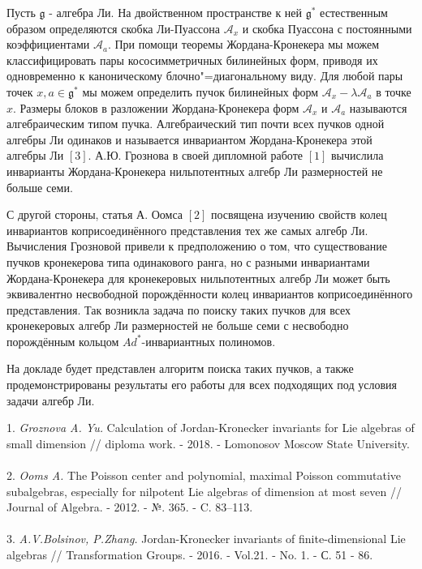 

\vzmscaption



Пусть $\mathfrak{g}$ - алгебра Ли. На двойственном пространстве к ней $\mathfrak{g}^{\ast}$ естественным образом определяются скобка Ли-Пуассона $\mathcal{A}_{x}$ и скобка Пуассона с постоянными коэффициентами $\mathcal{A}_{a}$. При помощи теоремы Жордана-Кронекера мы можем классифицировать пары кососимметричных билинейных форм, приводя их одновременно к каноническому блочно"=диагональному виду. Для любой пары точек $x,a \in\mathfrak{g}^{\ast}$ мы можем определить пучок билинейных форм $\mathcal{A}_{x} - \lambda \mathcal{A}_{a}$ в точке $x$. Размеры блоков в разложении Жордана-Кро\-не\-ке\-ра форм $\mathcal{A}_{x}$ и $\mathcal{A}_{a}$ называются алгебраическим типом пучка. Алгебраический тип почти всех пучков одной алгебры Ли одинаков и называется инвариантом Жордана-Кронекера этой алгебры Ли $\left[ 3 \right]$. А.Ю. Грознова в своей дипломной работе $\left[ 1 \right]$ вычислила инварианты Жордана-Кронекера нильпотентных алгебр Ли размерностей не больше семи.

С другой стороны, статья А. Оомса $\left[ 2 \right] $ посвящена изучению свойств колец инвариантов коприсоединённого представления тех же самых алгебр Ли. Вычисления Грозновой привели к предположению о том, что существование пучков кронекерова типа одинакового ранга, но с разными инвариантами Жордана-Кронекера для кронекеровых нильпотентных алгебр Ли может быть эквивалентно несвободной порождённости колец инвариантов коприсоединённого представления. Так возникла задача по поиску таких пучков для всех кронекеровых алгебр Ли размерностей не больше семи с несвободно порождённым кольцом $Ad^{\ast}$-инвариантных полиномов.

На докладе будет представлен алгоритм поиска таких пучков, а также продемонстрированы результаты его работы для всех подходящих под условия задачи алгебр Ли.

\litlist


1. {\it Groznova A. Yu.}
Calculation of Jordan-Kronecker in\-va\-riants for Lie algebras of small dimension // diploma work. - 2018. - Lomonosov Moscow State University.\\
\\
2. {\it Ooms A.}
The Poisson center and polynomial, maximal Poisson commutative subalgebras, especially for nilpotent Lie algebras of dimension at most seven // Journal of Algebra. - 2012. - №. 365. - C. 83--113.\\
\\
3. {\it A.V.Bolsinov, P.Zhang.}
Jordan-Kronecker invariants of finite-dimensional Lie algebras // Transformation Groups. - 2016. -   Vol.21. - No. 1. -  С. 51 - 86.
